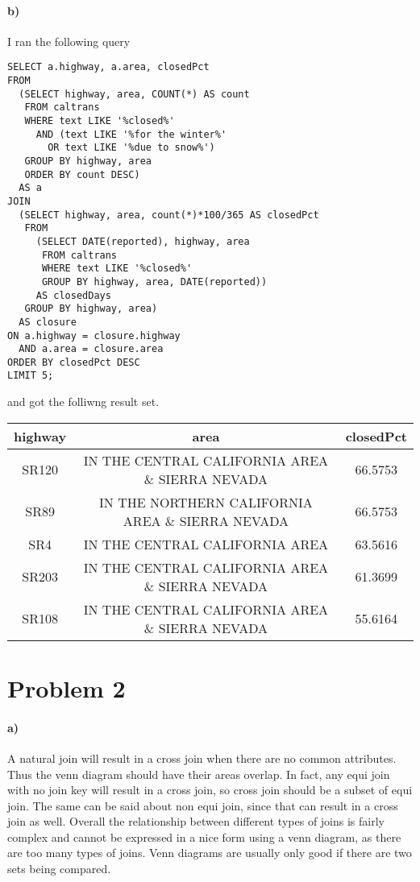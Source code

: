 \documentclass[12pt]{article}
\begin{document}
\paragraph{b)}

I ran the following query
\begin{verbatim}
SELECT a.highway, a.area, closedPct
FROM
  (SELECT highway, area, COUNT(*) AS count
   FROM caltrans
   WHERE text LIKE '%closed%'
     AND (text LIKE '%for the winter%'
       OR text LIKE '%due to snow%')
   GROUP BY highway, area
   ORDER BY count DESC)
  AS a
JOIN
  (SELECT highway, area, count(*)*100/365 AS closedPct
   FROM
     (SELECT DATE(reported), highway, area
      FROM caltrans
      WHERE text LIKE '%closed%'
      GROUP BY highway, area, DATE(reported))
     AS closedDays
   GROUP BY highway, area)
  AS closure
ON a.highway = closure.highway
  AND a.area = closure.area
ORDER BY closedPct DESC
LIMIT 5;
\end{verbatim}
and got the folliwng result set.
\begin{center}
        \hspace*{-4cm}
        \begin{tabular}{c|c|c}
                highway & area & closedPct\\
                \hline
                SR120 & IN THE CENTRAL CALIFORNIA AREA \& SIERRA NEVADA & 66.5753\\
                SR89 & IN THE NORTHERN CALIFORNIA AREA \& SIERRA NEVADA & 66.5753\\
                SR4 & IN THE CENTRAL CALIFORNIA AREA & 63.5616\\
                SR203 & IN THE CENTRAL CALIFORNIA AREA \& SIERRA NEVADA & 61.3699\\
                SR108 & IN THE CENTRAL CALIFORNIA AREA \& SIERRA NEVADA & 55.6164
        \end{tabular}
        \hspace*{-4cm}
\end{center}

\section*{Problem 2}

\paragraph{a)}

A natural join will result in a cross join when there are no common attributes. Thus the venn diagram
should have their areas overlap. In fact, any equi join with no join key will result in a cross join,
so cross join should be a subset of equi join. The same can be said about non equi join, since that can
result in a cross join as well. Overall the relationship between different types of joins is fairly
complex and cannot be expressed in a nice form using a venn diagram, as there are too many types of joins.
Venn diagrams are usually only good if there are two sets being compared.
\end{document}
